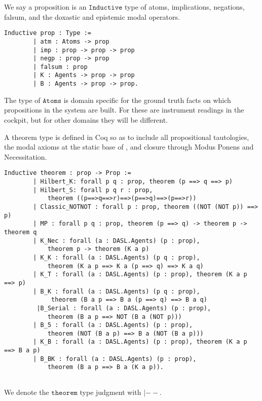 We say a proposition is an $\mathtt{Inductive}$ type of atoms, implications, negations, falsum, and the doxastic and epistemic modal operators.

\begin{tcolorbox}
	\begin{lstlisting}[language=Coq]
	Inductive prop : Type :=
		| atm : Atoms -> prop
		| imp : prop -> prop -> prop
		| negp : prop -> prop
		| falsum : prop
		| K : Agents -> prop -> prop
		| B : Agents -> prop -> prop.
	\end{lstlisting}	
	
\end{tcolorbox}

The type of $\mathtt{Atoms}$ is domain specific for the ground truth facts on which propositions in the system are built. For \DASL these are instrument readings in the cockpit, but for other domains they will be different.

A theorem type is defined in Coq so as to include all propositional tautologies, the modal axioms at the static base of \DASL, and closure through Modus Ponens and Necessitation.

\begin{tcolorbox}
	\begin{lstlisting}[language=Coq]
	Inductive theorem : prop -> Prop :=
		| Hilbert_K: forall p q : prop, theorem (p ==> q ==> p)
		| Hilbert_S: forall p q r : prop, 
			theorem ((p==>q==>r)==>(p==>q)==>(p==>r))
		| Classic_NOTNOT : forall p : prop, theorem ((NOT (NOT p)) ==> p)
		| MP : forall p q : prop, theorem (p ==> q) -> theorem p -> theorem q
		| K_Nec : forall (a : DASL.Agents) (p : prop), 
			theorem p -> theorem (K a p)
		| K_K : forall (a : DASL.Agents) (p q : prop), 
			theorem (K a p ==> K a (p ==> q) ==> K a q)
		| K_T : forall (a : DASL.Agents) (p : prop), theorem (K a p ==> p)
		| B_K : forall (a : DASL.Agents) (p q : prop),
			 theorem (B a p ==> B a (p ==> q) ==> B a q)
		 |B_Serial : forall (a : DASL.Agents) (p : prop), 
		 	theorem (B a p ==> NOT (B a (NOT p)))
		| B_5 : forall (a : DASL.Agents) (p : prop), 
			theorem (NOT (B a p) ==> B a (NOT (B a p)))
		| K_B : forall (a : DASL.Agents) (p : prop), theorem (K a p ==> B a p)
		| B_BK : forall (a : DASL.Agents) (p : prop), 
			theorem (B a p ==> B a (K a p)).
	
	\end{lstlisting}	
	
\end{tcolorbox}

We denote the $\mathtt{theorem}$ type judgment with $\mathtt{|--}$. 

